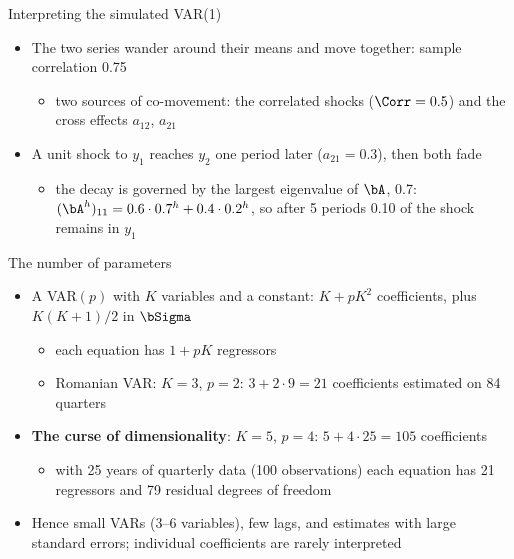 \begin{frame}{Interpreting the simulated VAR(1)}
\itemsize{\small}
\begin{itemize}
    \item The two series wander around their means and move together: sample correlation 0.75
    \begin{itemize}
        \item two sources of co-movement: the correlated shocks ($\Corr = 0.5$) and the cross effects $a_{12}$, $a_{21}$
    \end{itemize}
    \item A unit shock to $y_1$ reaches $y_2$ one period later ($a_{21} = 0.3$), then both fade
    \begin{itemize}
        \item the decay is governed by the largest eigenvalue of $\bA$, 0.7: $(\bA^h)_{11} = 0.6 \cdot 0.7^h + 0.4 \cdot 0.2^h$, so after 5 periods 0.10 of the shock remains in $y_1$
    \end{itemize}
\end{itemize}
\end{frame}

\begin{frame}{The number of parameters}
\itemsize{\small}
\begin{itemize}
    \item A VAR$(p)$ with $K$ variables and a constant: $K + pK^2$ coefficients, plus $K(K+1)/2$ in $\bSigma$
    \begin{itemize}
        \item each equation has $1 + pK$ regressors
        \item Romanian VAR: $K = 3$, $p = 2$: $3 + 2 \cdot 9 = 21$ coefficients estimated on 84 quarters
    \end{itemize}
    \item \textbf{The curse of dimensionality}: $K = 5$, $p = 4$: $5 + 4 \cdot 25 = 105$ coefficients
    \begin{itemize}
        \item with 25 years of quarterly data (100 observations) each equation has 21 regressors and 79 residual degrees of freedom
    \end{itemize}
    \item Hence small VARs (3--6 variables), few lags, and estimates with large standard errors; individual coefficients are rarely interpreted
\end{itemize}
\end{frame}


